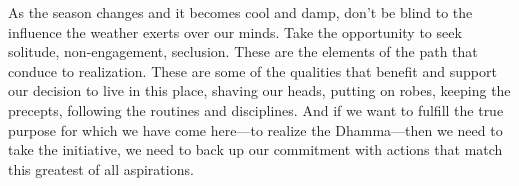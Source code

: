 As the season changes and it becomes cool and damp, don't be blind to 
the influence the weather exerts over our minds. Take the opportunity 
to seek solitude, non-engagement, seclusion. These are the elements of 
the path that conduce to realization. These are some of the qualities 
that benefit and support our decision to live in this place, shaving 
our heads, putting on robes, keeping the precepts, following the 
routines and disciplines. And if we want to fulfill the true purpose 
for which we have come here---to realize the Dhamma---then we need to 
take the initiative, we need to back up our commitment with actions 
that match this greatest of all aspirations.

